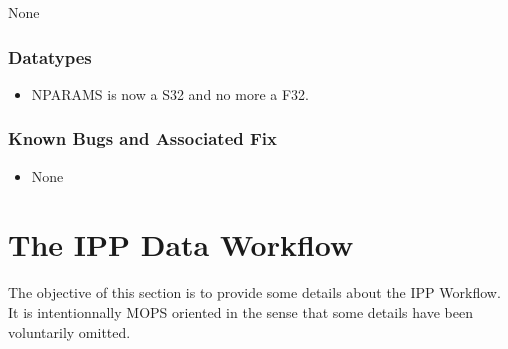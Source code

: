 \documentclass[panstarrs,spec]{panstarrs}
\begin{document}
None

\subsubsection{Datatypes}
\begin{itemize}
\item NPARAMS is now a S32 and no more a F32.
\end{itemize}

\subsubsection{Known Bugs and Associated Fix}

\begin{itemize}
\item None
\end{itemize}

\newpage

\appendix

\section{The IPP Data Workflow}

The objective of this section is to provide some details about the IPP
Workflow. It is intentionnally MOPS oriented in the sense that some
details have been voluntarily omitted.
\end{document}
